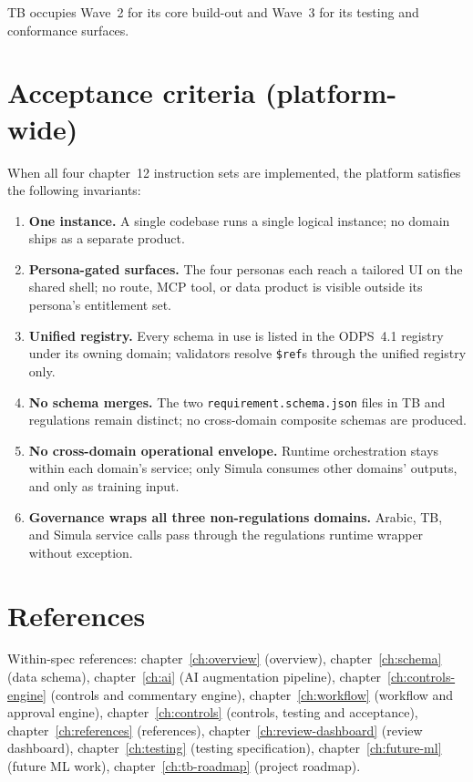 TB occupies Wave~2 for its core build-out and Wave~3 for its testing
and conformance surfaces.

\section{Acceptance criteria (platform-wide)}
\label{sec:agent-acceptance}
When all four chapter~12 instruction sets are implemented, the
platform satisfies the following invariants:

\begin{enumerate}
  \item \textbf{One instance.} A single codebase runs a single
    logical instance; no domain ships as a separate product.
  \item \textbf{Persona-gated surfaces.} The four personas each
    reach a tailored UI on the shared shell; no route, MCP tool, or
    data product is visible outside its persona's entitlement set.
  \item \textbf{Unified registry.} Every schema in use is listed in
    the ODPS~4.1 registry under its owning domain; validators
    resolve \texttt{\$ref}s through the unified registry only.
  \item \textbf{No schema merges.} The two
    \texttt{requirement.schema.json} files in TB and regulations
    remain distinct; no cross-domain composite schemas are produced.
  \item \textbf{No cross-domain operational envelope.} Runtime
    orchestration stays within each domain's service; only Simula
    consumes other domains' outputs, and only as training input.
  \item \textbf{Governance wraps all three non-regulations domains.}
    Arabic, TB, and Simula service calls pass through the
    regulations runtime wrapper without exception.
  \end{enumerate}

\section{References}
\label{sec:agent-references}
Within-spec references:
chapter~\ref{ch:overview} (overview),
chapter~\ref{ch:schema} (data schema),
chapter~\ref{ch:ai} (AI augmentation pipeline),
chapter~\ref{ch:controls-engine} (controls and commentary engine),
chapter~\ref{ch:workflow} (workflow and approval engine),
chapter~\ref{ch:controls} (controls, testing and acceptance),
chapter~\ref{ch:references} (references),
chapter~\ref{ch:review-dashboard} (review dashboard),
chapter~\ref{ch:testing} (testing specification),
chapter~\ref{ch:future-ml} (future ML work),
chapter~\ref{ch:tb-roadmap} (project roadmap).

